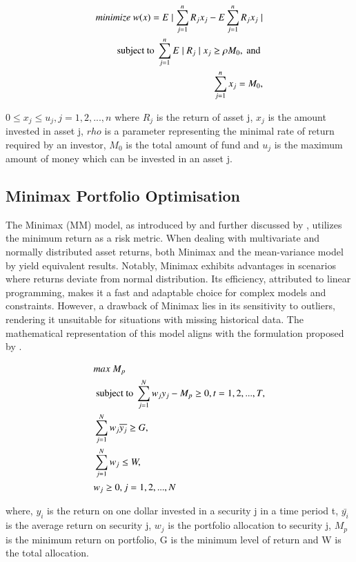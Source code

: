 \[\begin{aligned} minimize~ w(x) = E \mid \sum _{j=1}^{n}R_j x_j - E \sum _{j=1}^{n}R_j x_j \mid \nonumber \\ \hbox { subject to } \sum _{j=1}^{n}E\mid R_j \mid x_j \ge \rho M_0,\hbox { and }\nonumber \\ \sum _{j=1}^{n}x_j = M_0, \end{aligned}\]

$0 \le x_j \le u_j, j=1,2, ..., n$ where $R_j$ is the return of asset j, $x_j$ is the amount invested in asset j, $rho$ is a parameter representing the minimal rate of return required by an investor, $M_0$ is the total amount of fund and $u_j$ is the maximum amount of money which can be invested in an asset j.

\subsection{Minimax Portfolio Optimisation}
The Minimax (MM) model, as introduced by \cite{Cai2004} and further discussed by \cite{Li2019}, utilizes the minimum return as a risk metric. When dealing with multivariate and normally distributed asset returns, both Minimax \cite{Cai2004} and the mean-variance model by \citep{Markowitz1952} yield equivalent results. Notably, Minimax exhibits advantages in scenarios where returns deviate from normal distribution. Its efficiency, attributed to linear programming, makes it a fast and adaptable choice for complex models and constraints. However, a drawback of Minimax lies in its sensitivity to outliers, rendering it unsuitable for situations with missing historical data. The mathematical representation of this model aligns with the formulation proposed by \cite{Cai2004}.

\[\begin{aligned}&max~ M_p \nonumber \\&\hbox { subject to } \sum _{j=1}^{N} w_j y_j - M_p \ge 0, t=1, 2, ..., T,\nonumber \\&\sum _{j=1}^{N} w_j \overline{y_j} \ge G, \nonumber \\&\sum _{j=1}^{N} w_j \le W, \nonumber \\&w_j \ge 0, j=1, 2, ..., N \end{aligned}\]

where, $y_i$  is the return on one dollar invested in a security j in a time period t, $\bar{y_i}$ is the average return on security j, $w_j$  is the portfolio allocation to security j, $M_p$ is the minimum return on portfolio, G is the minimum level of return and W is the total allocation.

